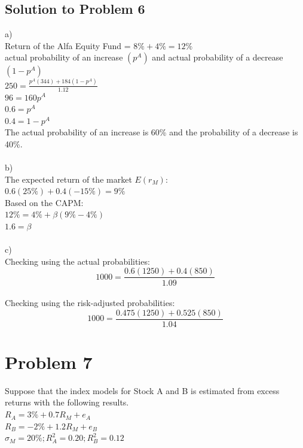 \documentclass[12]{article}
\begin{document}
\subsection*{Solution to Problem 6}
a)\\
Return of the Alfa Equity Fund = $8\% + 4\% = 12\%$\\
actual probability of an increase $(p^A)$ and actual probability of a decrease $(1-p^A)$\\
$250 = \frac{p^A(344) + 184(1-p^A)}{1.12}$\\
$96 = 160p^A$\\
$0.6 = p^A$\\
$0.4 = 1- p^A$\\
The actual probability of an increase is 60\% and the probability of a decrease is 40\%.\\
\\
b)\\
The expected return of the market $E(r_M)$:\\
$0.6(25\%) + 0.4(-15\%) = 9\%$\\
Based on the CAPM:\\
$12\% = 4\% + \beta(9\% - 4\%)$\\
$1.6 = \beta$\\
\\
c)\\
Checking using the actual probabilities:\\
\begin{equation*}
    1000 = \frac{0.6(1250) + 0.4(850)}{1.09}
\end{equation*}
\\
Checking using the risk-adjusted probabilities:\\
\begin{equation*}
    1000 = \frac{0.475(1250) + 0.525(850)}{1.04}
\end{equation*}





\color{black}
\section*{Problem 7}
Suppose that the index models for Stock A and B is estimated from excess returns with the following results.\\
$R_A = 3\% + 0.7R_M + e_A$\\
$R_B = -2\% + 1.2R_M + e_B$\\
$\sigma_M = 20\%; R_A^2 = 0.20; R_B^2 = 0.12 $
\end{document}

